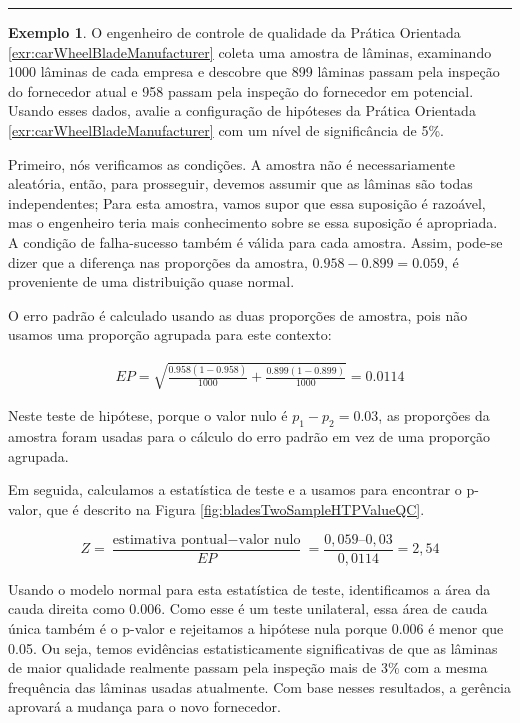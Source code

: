 \documentclass[
]{book}
\theoremstyle{definition}
\theoremstyle{definition}
\newtheorem{example}{Exemplo}[chapter]
\theoremstyle{definition}
\theoremstyle{definition}
\theoremstyle{remark}
\begin{document}
\begin{center}\rule{0.5\linewidth}{0.5pt}\end{center}

\begin{example}
\protect\hypertarget{exm:unnamed-chunk-235}{}{\label{exm:unnamed-chunk-235} } O engenheiro de controle de qualidade da Prática Orientada \ref{exr:carWheelBladeManufacturer} coleta uma amostra de lâminas, examinando 1000 lâminas de cada empresa e descobre que 899 lâminas passam pela inspeção do fornecedor atual e 958 passam pela inspeção do fornecedor em potencial. Usando esses dados, avalie a configuração de hipóteses da Prática Orientada \ref{exr:carWheelBladeManufacturer} com um nível de significância de 5\%.
\end{example}

Primeiro, nós verificamos as condições. A amostra não é necessariamente aleatória, então, para prosseguir, devemos assumir que as lâminas são todas independentes; Para esta amostra, vamos supor que essa suposição é razoável, mas o engenheiro teria mais conhecimento sobre se essa suposição é apropriada. A condição de falha-sucesso também é válida para cada amostra. Assim, pode-se dizer que a diferença nas proporções da amostra, \(0.958 - 0.899 = 0.059\), é proveniente de uma distribuição quase normal.

O erro padrão é calculado usando as duas proporções de amostra, pois não usamos uma proporção agrupada para este contexto:

\begin{align*}
EP = \sqrt{\frac{0.958(1-0.958)}{1000} + \frac{0.899(1-0.899)}{1000}} = 0.0114
\end{align*}

Neste teste de hipótese, porque o valor nulo é \(p_1 - p_2 = 0.03\), as proporções da amostra foram usadas para o cálculo do erro padrão em vez de uma proporção agrupada.

Em seguida, calculamos a estatística de teste e a usamos para encontrar o p-valor, que é descrito na Figura \ref{fig:bladesTwoSampleHTPValueQC}.

\[Z = \frac{\text{estimativa pontual} - \text{valor nulo}}{EP} = \frac{0,059 – 0,03}{0,0114} = 2,54\]

Usando o modelo normal para esta estatística de teste, identificamos a área da cauda direita como 0.006. Como esse é um teste unilateral, essa área de cauda única também é o p-valor e rejeitamos a hipótese nula porque 0.006 é menor que 0.05. Ou seja, temos evidências estatisticamente significativas de que as lâminas de maior qualidade realmente passam pela inspeção mais de 3\% com a mesma frequência das lâminas usadas atualmente. Com base nesses resultados, a gerência aprovará a mudança para o novo fornecedor.
\end{document}

